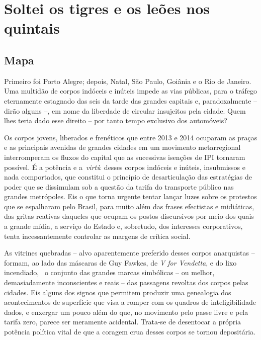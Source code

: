 \section{Soltei os tigres e os leões nos quintais}


\subsection{Mapa}

Primeiro foi Porto Alegre; depois, Natal, São
Paulo, Goiânia e o Rio de Janeiro. Uma multidão de corpos indóceis e
inúteis impede as vias públicas, para o tráfego eternamente estagnado
das seis da tarde das grandes capitais e, paradoxalmente -- dirão alguns
--, em nome da liberdade de circular insujeitos pela cidade. Quem lhes
teria dado esse direito -- por tanto tempo exclusivo dos automóveis?

Os corpos jovens, liberados e frenéticos que entre 2013 e 2014 ocuparam
as praças e as principais avenidas de grandes cidades em um movimento
metarregional interromperam os fluxos do capital que as sucessivas
isenções de IPI tornaram possível. É a potência e a~\emph{virtù~}desses
corpos indóceis e inúteis, insubmissos e nada comportados, que constitui
o princípio de desarticulação das estratégias de poder que se dissimulam
sob a questão da tarifa do transporte público nas grandes metrópoles.
Eis o que torna urgente tentar lançar luzes sobre os protestos que se
espalharam pelo Brasil, para muito além das frases efectistas e
midiáticas, das gritas reativas daqueles que ocupam os postos
discursivos por meio dos quais a grande mídia, a serviço do Estado e,
sobretudo, dos interesses corporativos, tenta incessantemente controlar
as margens de crítica social.

As vitrines quebradas -- alvo aparentemente preferido desses corpos
anarquistas -- formam, ao lado das máscaras de Guy Fawkes, de \emph{V
for Vendetta}, e do lixo incendiado,~ o conjunto das grandes marcas
simbólicas -- ou melhor, demasiadamente inconscientes e reais -- das
passagens revoltas dos corpos pelas cidades. Eis alguns dos signos que
permitem produzir uma genealogia dos acontecimentos de superfície que
visa a romper com os quadros de inteligibilidade dados, e enxergar um
pouco além do que, no movimento pelo passe livre e pela tarifa zero,
parece ser meramente acidental. Trata-se de desentocar a própria
potência política vital de que a coragem crua desses corpos se tornou
depositária.

